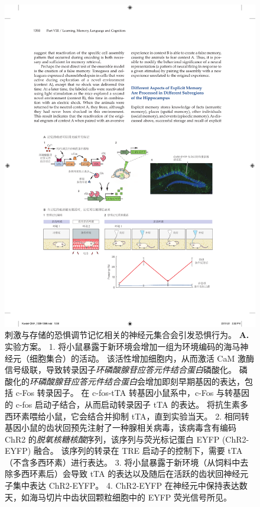 \begin{figure}[htbp]
	\centering
	\includegraphics[width=1.0\linewidth]{chap54/fig_54_11}
	\caption{刺激与存储的恐惧调节记忆相关的神经元集合会引发恐惧行为\cite{liu2012optogenetic}。
		\textbf{A.} 实验方案。
		1. 将小鼠暴露于新环境会增加一组为环境编码的海马神经元（细胞集合）的活动。
		该活性增加细胞内，从而激活 CaM 激酶信号级联，导致转录因子\textit{环磷酸腺苷应答元件结合蛋白}磷酸化。
		磷酸化的\textit{环磷酸腺苷应答元件结合蛋白}会增加即刻早期基因的表达，包括 c-Fos 转录因子。
		在 c-fos-tTA 转基因小鼠系中，c-Fos 与转基因的 c-fos 启动子结合，从而启动转录因子 tTA 的表达。
		将抗生素多西环素喂给小鼠，它会结合并抑制 tTA，直到实验当天。
		2. 相同转基因小鼠的齿状回预先注射了一种腺相关病毒，该病毒含有编码 ChR2 的\textit{脱氧核糖核酸}序列，该序列与荧光标记蛋白 EYFP (ChR2-EYFP) 融合。
		该序列的转录在 TRE 启动子的控制下，需要 tTA（不含多西环素）进行表达。
		3. 将小鼠暴露于新环境（从饲料中去除多西环素后）会导致 tTA 的表达以及随后在活跃的齿状回神经元子集中表达 ChR2-EYFP。
		4. ChR2-EYFP 在神经元中保持表达数天，如海马切片中齿状回颗粒细胞中的 EYFP 荧光信号所见。
}
\end{figure}
